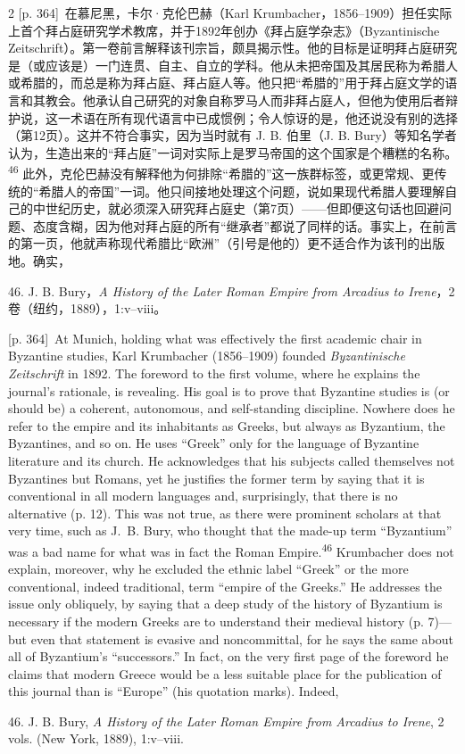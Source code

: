 \documentclass[10pt,a4paper]{article}
\begin{document}
\begin{paracol}{2}
{\scriptsize\color{gray}[p. 364]}\ 在慕尼黑，卡尔·克伦巴赫（Karl Krumbacher，1856–1909）担任实际上首个拜占庭研究学术教席，并于1892年创办《拜占庭学杂志》（Byzantinische Zeitschrift）。第一卷前言解释该刊宗旨，颇具揭示性。他的目标是证明拜占庭研究是（或应该是）一门连贯、自主、自立的学科。他从未把帝国及其居民称为希腊人或希腊的，而总是称为拜占庭、拜占庭人等。他只把“希腊的”用于拜占庭文学的语言和其教会。他承认自己研究的对象自称罗马人而非拜占庭人，但他为使用后者辩护说，这一术语在所有现代语言中已成惯例；令人惊讶的是，他还说没有别的选择（第12页）。这并不符合事实，因为当时就有 J. B. 伯里（J. B. Bury）等知名学者认为，生造出来的“拜占庭”一词对实际上是罗马帝国的这个国家是个糟糕的名称。\nobreak\textsuperscript{46} 此外，克伦巴赫没有解释他为何排除“希腊的”这一族群标签，或更常规、更传统的“希腊人的帝国”一词。他只间接地处理这个问题，说如果现代希腊人要理解自己的中世纪历史，就必须深入研究拜占庭史（第7页）——但即便这句话也回避问题、态度含糊，因为他对拜占庭的所有“继承者”都说了同样的话。事实上，在前言的第一页，他就声称现代希腊比“欧洲”（引号是他的）更不适合作为该刊的出版地。确实，\par{\small 46. J. B. Bury，\textit{A History of the Later Roman Empire from Arcadius to Irene}，2卷（纽约，1889），1:v–viii。\par}
\switchcolumn
{\scriptsize\color{gray}[p. 364]}\ At Munich, holding what was effectively the first academic chair in Byzantine studies, Karl Krumbacher (1856–1909) founded \textit{Byzantinische Zeitschrift} in 1892. The foreword to the first volume, where he explains the journal’s rationale, is revealing. His goal is to prove that Byzantine studies is (or should be) a coherent, autonomous, and self-standing discipline. Nowhere does he refer to the empire and its inhabitants as Greeks, but always as Byzantium, the Byzantines, and so on. He uses “Greek” only for the language of Byzantine literature and its church. He acknowledges that his subjects called themselves not Byzantines but Romans, yet he justifies the former term by saying that it is conventional in all modern languages and, surprisingly, that there is no alternative (p. 12). This was not true, as there were prominent scholars at that very time, such as J. B. Bury, who thought that the made-up term “Byzantium” was a bad name for what was in fact the Roman Empire.\nobreak\textsuperscript{46} Krumbacher does not explain, moreover, why he excluded the ethnic label “Greek” or the more conventional, indeed traditional, term “empire of the Greeks.” He addresses the issue only obliquely, by saying that a deep study of the history of Byzantium is necessary if the modern Greeks are to understand their medieval history (p. 7)—but even that statement is evasive and noncommittal, for he says the same about all of Byzantium’s “successors.” In fact, on the very first page of the foreword he claims that modern Greece would be a less suitable place for the publication of this journal than is “Europe” (his quotation marks). Indeed,\par{\small 46. J. B. Bury, \textit{A History of the Later Roman Empire from Arcadius to Irene}, 2 vols. (New York, 1889), 1:v–viii.\par}

\end{paracol}
\end{document}
